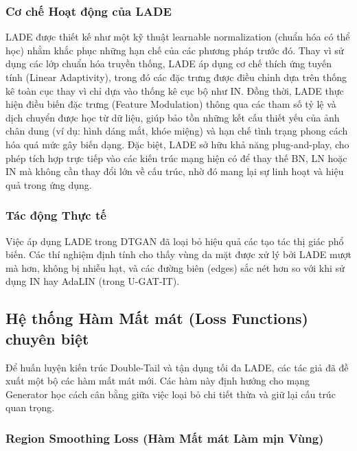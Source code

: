 \subsubsection{Cơ chế Hoạt động của LADE}
LADE được thiết kế như một kỹ thuật learnable normalization (chuẩn hóa có thể học) nhằm khắc phục những hạn chế của các phương pháp trước đó. Thay vì sử dụng các lớp chuẩn hóa truyền thống, LADE áp dụng cơ chế thích ứng tuyến tính (Linear Adaptivity), trong đó các đặc trưng được điều chỉnh dựa trên thống kê toàn cục thay vì chỉ dựa vào thống kê cục bộ như IN. Đồng thời, LADE thực hiện điều biến đặc trưng (Feature Modulation) thông qua các tham số tỷ lệ và dịch chuyển được học từ dữ liệu, giúp bảo tồn những kết cấu thiết yếu của ảnh chân dung (ví dụ: hình dáng mắt, khóe miệng) và hạn chế tình trạng phong cách hóa quá mức gây biến dạng. Đặc biệt, LADE sở hữu khả năng plug-and-play, cho phép tích hợp trực tiếp vào các kiến trúc mạng hiện có để thay thế BN, LN hoặc IN mà không cần thay đổi lớn về cấu trúc, nhờ đó mang lại sự linh hoạt và hiệu quả trong ứng dụng.

\subsubsection{Tác động Thực tế}
Việc áp dụng LADE trong DTGAN đã loại bỏ hiệu quả các tạo tác thị giác phổ biến. Các thí nghiệm định tính cho thấy vùng da mặt được xử lý bởi LADE mượt mà hơn, không bị nhiễu hạt, và các đường biên (edges) sắc nét hơn so với khi sử dụng IN hay AdaLIN (trong U-GAT-IT).

\subsection{Hệ thống Hàm Mất mát (Loss Functions) chuyên biệt}
Để huấn luyện kiến trúc Double-Tail và tận dụng tối đa LADE, các tác giả đã đề xuất một bộ các hàm mất mát mới. Các hàm này định hướng cho mạng Generator học cách cân bằng giữa việc loại bỏ chi tiết thừa và giữ lại cấu trúc quan trọng.

\subsubsection{Region Smoothing Loss (Hàm Mất mát Làm mịn Vùng)}

